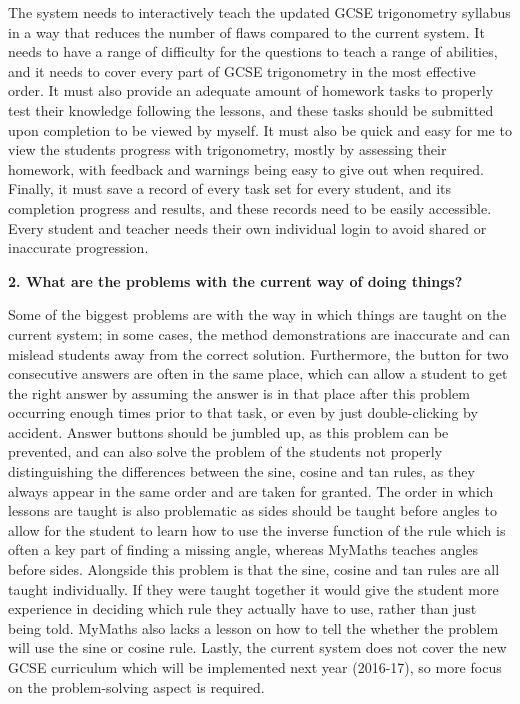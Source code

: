 The system needs to interactively teach the updated GCSE trigonometry syllabus in a way that reduces the number of flaws compared to the current system. It needs to have a range of difficulty for the questions to teach a range of abilities, and it needs to cover every part of GCSE trigonometry in the most effective order. It must also provide an adequate amount of homework tasks to properly test their knowledge following the lessons, and these tasks should be submitted upon completion to be viewed by myself. It must also be quick and easy for me to view the students progress with trigonometry, mostly by assessing their homework, with feedback and warnings being easy to give out when required. Finally, it must save a record of every task set for every student, and its completion progress and results, and these records need to be easily accessible. Every student and teacher needs their own individual login to avoid shared or inaccurate progression.

\textbf{2. What are the problems with the current way of doing things?}

Some of the biggest problems are with the way in which things are taught on the current system; in some cases, the method demonstrations are inaccurate and can mislead students away from the correct solution. Furthermore, the button for two consecutive answers are often in the same place, which can allow a student to get the right answer by assuming the answer is in that place after this problem occurring enough times prior to that task, or even by just double-clicking by accident. Answer buttons should be jumbled up, as this problem can be prevented, and can also solve the problem of the students not properly distinguishing the differences between the sine, cosine and tan rules, as they always appear in the same order and are taken for granted. The order in which lessons are taught is also problematic as sides should be taught before angles to allow for the student to learn how to use the inverse function of the rule which is often a key part of finding a missing angle, whereas MyMaths teaches angles before sides. Alongside this problem is that the sine, cosine and tan rules are all taught individually. If they were taught together it would give the student more experience in deciding which rule they actually have to use, rather than just being told. MyMaths also lacks a lesson on how to tell the whether the problem will use the sine or cosine rule. Lastly, the current system does not cover the new GCSE curriculum which will be implemented next year (2016-17), so more focus on the problem-solving aspect is required.

